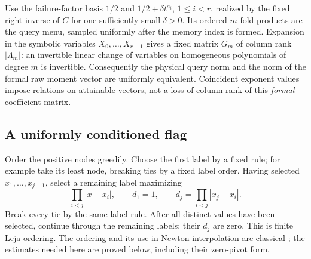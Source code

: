 Use the failure-factor basis $1/2$ and $1/2+\delta t^{a_i}$,
$1\le i<r$, realized by the fixed right inverse of $C$ for one
sufficiently small $\delta>0$. Its ordered $m$-fold products are the
query menu, sampled uniformly after the memory index is formed. Expansion
in the symbolic variables $X_0,\ldots,X_{r-1}$ gives a fixed matrix
$G_m$ of column rank $|\Lambda_m|$: an invertible linear change of
variables on homogeneous polynomials of degree $m$ is invertible.
Consequently the physical query norm and the norm of the formal raw
moment vector are uniformly equivalent. Coincident exponent values impose
relations on attainable vectors, not a loss of column rank of this
\emph{formal} coefficient matrix.

\subsection{A uniformly conditioned flag}
Order the positive nodes greedily. Choose the first label by a fixed rule;
for example take its least node, breaking ties by a fixed label order.
Having selected $x_1,\ldots,x_{j-1}$, select a remaining label maximizing
\[
 \prod_{i<j}|x-x_i|,
 \qquad d_1=1,\qquad d_j=\prod_{i<j}|x_j-x_i|.
\]
Break every tie by the same label rule. After all distinct values have
been selected, continue through the remaining labels; their $d_j$ are
zero. This is finite Leja ordering. The ordering and its use in Newton
interpolation are classical \cite{Leja,BosEtAl}; the estimates needed
here are proved below, including their zero-pivot form.

